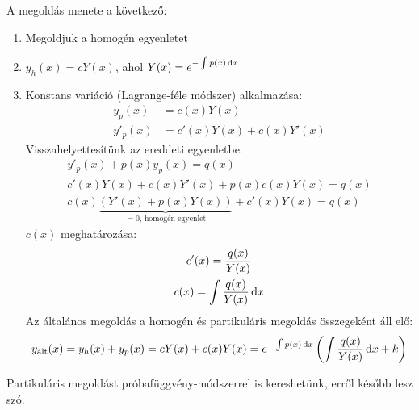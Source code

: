 \documentclass[main.tex]{subfiles}
\begin{document}
\begin{itemize}
        A megoldás menete a következő:
        \begin{enumerate}
          \item Megoldjuk a homogén egyenletet
          \item $y_h(x) = c Y(x)$, ahol $Y(x)
                  = e^{-\int p(x) \, \mathrm{d} x} $
          \item Konstans variáció (Lagrange-féle módszer) alkalmazása:
                \begin{align*}
                  y_p(x)  & = c(x)Y(x)
                  \\
                  y'_p(x) & = c'(x)Y(x) + c(x)Y'(x)
                \end{align*}
                Visszahelyettesítünk az ereddeti egyenletbe:
                \begin{gather*}
                  y'_p(x) + p(x)y_p(x) = q(x)
                  \\
                  c'(x)Y(x) + c(x)Y'(x) + p(x)c(x)Y(x) = q(x)
                  \\
                  c(x) \underbrace{\left(Y'(x) + p(x)Y(x) \right)}_{
                  = 0 \text{, homogén egyenlet}
                  } + c'(x)Y(x) = q(x)
                \end{gather*}
                $c(x)$ meghatározása:
                \begin{gather*}
                  c'(x) = \frac{q(x)}{Y(x)}
                  \\
                  c(x) = \int \frac{q(x)}{Y(x)} \,\mathrm{d} x
                \end{gather*}
                Az általános megoldás a homogén és partikuláris megoldás
                összegeként áll elő:
                \begin{equation*}
                  y_\text{ált}(x)
                  = y_h(x) + y_p(x)
                  = c Y(x) + c(x) Y(x)
                  = e^{-\int p(x) \, \mathrm{d} x} \left(
                  \int \frac{q(x)}{Y(x)} \, \mathrm{d} x + k
                  \right)
                \end{equation*}
        \end{enumerate}
\end{itemize}




Partikuláris megoldást próbafüggvény-módszerrel
is kereshetünk, erről később lesz szó.
\end{document}
